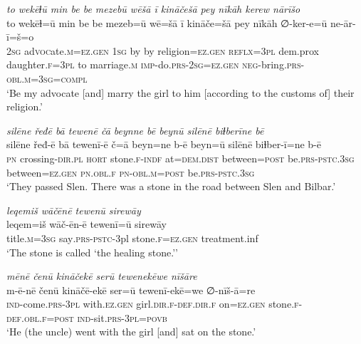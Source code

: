 \ea \label{ŽP.165}
\textit{to wekēɫū min be be mezebū wēšā ī kināčešā pey nīkāh kerew nārīšo} \\ 
\gll to wekēɫ=ū min be be mezeb=ū wē=šā ī kināče=šā pey nīkāh ∅-ker-e=ū ne-ār-ī=š=o \\ 
 \textsc{2sg} ad\textsc{voc}ate\textsc{.m}\textsc{\textsc{=ez.gen}} \textsc{1sg} by by religion\textsc{\textsc{=ez.gen}} \textsc{reflx}\textsc{=3pl} dem.prox daughter\textsc{.f}\textsc{=3pl} to marriage\textsc{.m} \textsc{imp-}do\textsc{.prs}-\textsc{2sg}\textsc{\textsc{=ez.gen}} \textsc{neg-}bring\textsc{.prs}\textsc{-obl}\textsc{.m}\textsc{=3sg}\textsc{=compl} \\ 
\glt `Be my advocate [and] marry the girl to him [according to the customs of] their religion.'
\z 
 
\ea \label{ŽP.167}
\textit{silēne řeđē bā tewenē čā beynne bē beynū silēnē biɫberīne bē} \\ 
\gll silēne řeđ-ē bā tewenī-ē č=ā beyn=ne b-ē beyn=ū silēnē biɫber-ī=ne b-ē \\ 
 \textsc{pn} crossing\textsc{-dir}\textsc{.pl} \textsc{hort} stone\textsc{.f}\textsc{-indf} at=\textsc{dem.dist} between\textsc{=\textsc{post}} be\textsc{.prs}\textsc{-pstc}\textsc{.3sg} between\textsc{\textsc{=ez.gen}} \textsc{pn}\textsc{.obl}\textsc{.f} \textsc{pn}\textsc{-obl}\textsc{.m}\textsc{=\textsc{post}} be\textsc{.prs}\textsc{-pstc}\textsc{.3sg} \\ 
\glt `They passed Slen. There was a stone in the road between Slen and Bilbar.'
\z 
 
\ea \label{ŽP.168}
\textit{leqemiš wāčēnē tewenū sirewāy} \\ 
\gll leqem=iš wāč-ēn-ē tewenī=ū sirewāy \\ 
 title\textsc{.m}\textsc{=3sg} say\textsc{.prs-pstc}-3pl stone\textsc{.f}\textsc{\textsc{=ez.gen}} treatment.inf \\ 
\glt `The stone is called ‘the healing stone.’'
\z 
 
\ea \label{ŽP.169}
\textit{mēnē čenū kināčekē serū tewenekēwe nīšāre} \\ 
\gll m-ē-nē čenū kināčē-ekē ser=ū tewenī-ekē=we ∅-nīš-ā=re \\ 
 \textsc{ind-}come\textsc{.prs}\textsc{-3pl} with\textsc{.ez.gen} girl\textsc{.dir}\textsc{.f}\textsc{-def}\textsc{.dir}\textsc{.f} on\textsc{\textsc{=ez.gen}} stone\textsc{.f}\textsc{-def}\textsc{.obl}\textsc{.f}\textsc{=\textsc{post}} \textsc{ind-}sit\textsc{.prs}\textsc{-3pl}\textsc{=\textsc{povb}} \\ 
\glt `He (the uncle) went with the girl [and] sat on the stone.'
\z 
 
